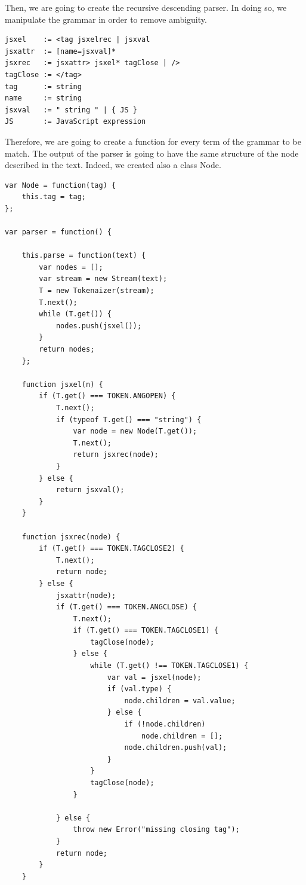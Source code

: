 \documentclass[10pt]{article}
\begin{document}
Then, we are going to create the recursive descending parser. In doing so, we manipulate the grammar in order to remove ambiguity. 
\begin{verbatim}
jsxel    := <tag jsxelrec | jsxval
jsxattr  := [name=jsxval]*
jsxrec   := jsxattr> jsxel* tagClose | />
tagClose := </tag>
tag      := string
name     := string
jsxval   := " string " | { JS }
JS       := JavaScript expression
\end{verbatim}
Therefore, we are going to create a function for every term of the grammar to be match. The output of the parser is going to have the same structure of the node described in the text. Indeed, we created also a class Node. 
\begin{lstlisting}[caption=Parser ]
var Node = function(tag) {
    this.tag = tag;
};

var parser = function() {

    this.parse = function(text) {
        var nodes = [];
        var stream = new Stream(text);
        T = new Tokenaizer(stream);
        T.next();
        while (T.get()) {
            nodes.push(jsxel());
        }
        return nodes;
    };

    function jsxel(n) {
        if (T.get() === TOKEN.ANGOPEN) {
            T.next();
            if (typeof T.get() === "string") {
                var node = new Node(T.get());
                T.next();
                return jsxrec(node);
            }
        } else {
            return jsxval();
        }
    }

    function jsxrec(node) {
        if (T.get() === TOKEN.TAGCLOSE2) {
            T.next();
            return node;
        } else {
            jsxattr(node);
            if (T.get() === TOKEN.ANGCLOSE) {
                T.next();
                if (T.get() === TOKEN.TAGCLOSE1) {
                    tagClose(node);
                } else {
                    while (T.get() !== TOKEN.TAGCLOSE1) {
                        var val = jsxel(node);
                        if (val.type) {
                            node.children = val.value;
                        } else {
                            if (!node.children)
                                node.children = [];
                            node.children.push(val);
                        }
                    }
                    tagClose(node);
                }

            } else {
                throw new Error("missing closing tag");
            }
            return node;
        }
    }


\end{lstlisting}
\end{document}
